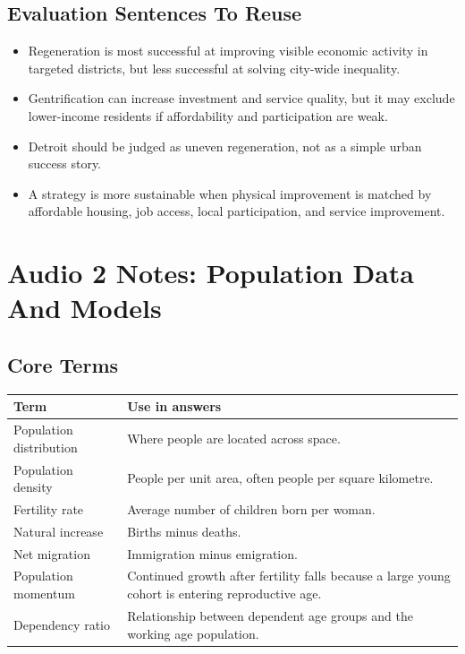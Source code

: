 \documentclass[11pt,a4paper]{article}
\begin{document}
\subsection{Evaluation Sentences To Reuse}

\begin{itemize}
  \item Regeneration is most successful at improving visible economic activity
  in targeted districts, but less successful at solving city-wide inequality.
  \item Gentrification can increase investment and service quality, but it may
  exclude lower-income residents if affordability and participation are weak.
  \item Detroit should be judged as uneven regeneration, not as a simple urban
  success story.
  \item A strategy is more sustainable when physical improvement is matched by
  affordable housing, job access, local participation, and service improvement.
\end{itemize}

\section{Audio 2 Notes: Population Data And Models}

\subsection{Core Terms}

\begin{tabularx}{\textwidth}{L{0.24\textwidth}Y}
\toprule
\textbf{Term} & \textbf{Use in answers} \\
\midrule
Population distribution & Where people are located across space. \\
Population density & People per unit area, often people per square kilometre. \\
Fertility rate & Average number of children born per woman. \\
Natural increase & Births minus deaths. \\
Net migration & Immigration minus emigration. \\
Population momentum & Continued growth after fertility falls because a large
young cohort is entering reproductive age. \\
Dependency ratio & Relationship between dependent age groups and the working
age population. \\
\bottomrule
\end{tabularx}
\end{document}
